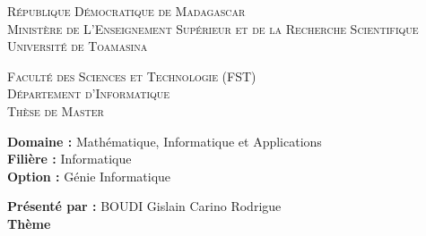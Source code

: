\begin{titlepage}
	\begin{center}
		\vspace*{-0.5cm}

		\noindent

		\begin{minipage}[c]{\logowidth}
			\univlogo
		\end{minipage}
		\hspace{5mm}
		\begin{minipage}[c]{0.7\textwidth}
			\begin{center}
				\textsc{{\large République Démocratique de Madagascar}}\\
				\textsc{{\large Ministère de L'Enseignement Supérieur et de la Recherche Scientifique}}\\
				\textsc{{\large Université de Toamasina}}\\[0.5cm]
			\end{center}
		\end{minipage}
		\hspace{1mm}
		\begin{minipage}[c]{\logowidth}
			\faclogo
		\end{minipage}

		\vspace{1.5cm}

		\textsc{{\large Faculté des Sciences et Technologie (FST)}}\\
		\textsc{{\large Département d'Informatique}}\\[0.28cm]
		\textsc{\Large Thèse de Master}\\


		\vspace{1.5cm}

		\begin{flushleft}
			\large {\textbf{Domaine :} Mathématique, Informatique et Applications}\\
			\large {\textbf{Filière :} Informatique}\\
			\large {\textbf{Option :} Génie Informatique}\\
		\end{flushleft}
		\Large {\textbf{Présenté par :} BOUDI Gislain Carino Rodrigue}\\[0.3cm]
		\Large {\textbf{Thème}}\\[-0.2cm]
		{\Large \bfseries{}}\\[0.3cm]


\end{center}
\end{titlepage}
